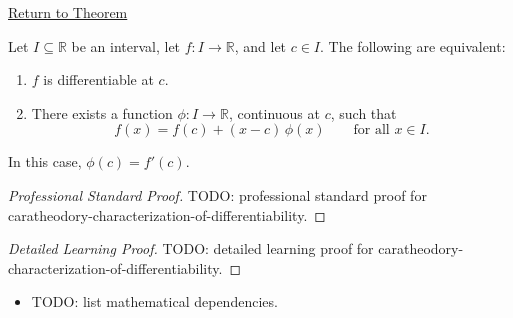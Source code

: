 \newpage
{}
\label{prf:caratheodory-characterization-of-differentiability}

\begin{remark*}[Return]
\hyperref[thm:caratheodory-characterization-of-differentiability]{Return to Theorem}
\end{remark*}

\begin{theorem*}
Let $I \subseteq \mathbb{R}$ be an interval, let $f : I \to \mathbb{R}$, and let $c \in I$. The following are equivalent:
\begin{enumerate}[label=(\roman*)]
\item $f$ is differentiable at $c$.
\item There exists a function $\phi : I \to \mathbb{R}$, continuous at $c$, such that
\[
f(x) = f(c) + (x-c)\,\phi(x) \qquad \text{for all } x \in I.
\]
\end{enumerate}
In this case, $\phi(c) = f'(c)$.
\end{theorem*}

\begin{proof}[Professional Standard Proof]
\LRAProofBodyStart
TODO: professional standard proof for caratheodory-characterization-of-differentiability.
\end{proof}

\begin{proof}[Detailed Learning Proof]
\LRAProofBodyStart
TODO: detailed learning proof for caratheodory-characterization-of-differentiability.
\end{proof}

\begin{remark*}
\end{remark*}

\begin{dependencies}
\begin{itemize}
  \item TODO: list mathematical dependencies.
\end{itemize}
\end{dependencies}

\clearpage

